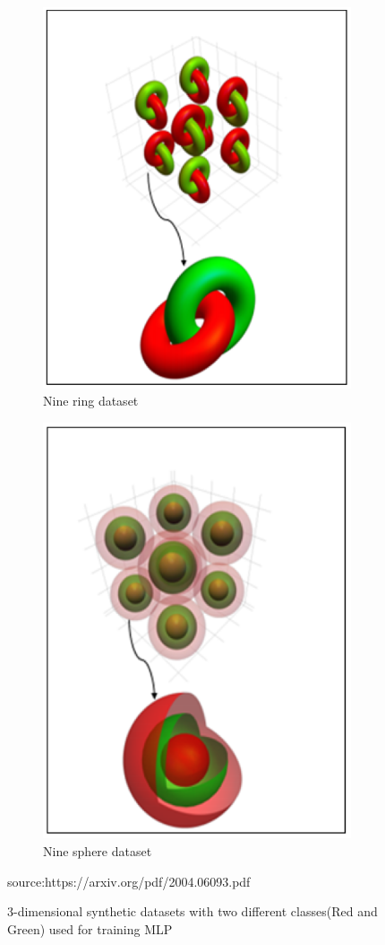 \documentclass{bmvc2k}
\begin{document}
\begin{figure}[ht]
\begin{subfigure}{.5\textwidth}
  \centering
  \includegraphics[width=.5\linewidth]{images/nine_ring_dataset.png}
  \caption{Nine ring dataset}
  \label{ninering}
\end{subfigure}
\begin{subfigure}{.5\textwidth}
  \centering
  \includegraphics[width=.48\linewidth]{images/nine_sphere_dataset.png}
  \caption{Nine sphere dataset}
  \label{ninesphere}
\end{subfigure}
\vspace{.1in}
\caption*{source:https://arxiv.org/pdf/2004.06093.pdf}
\vspace{.1in}
\caption{3-dimensional synthetic datasets with two different classes(Red and Green) used for training MLP}

\label{nine}
\end{figure}
%
\end{document}
